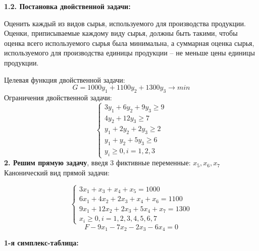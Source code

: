 {\bf1.2. Постановка двойственной задачи:}
\begin{flushleft}
    Оценить каждый из видов сырья, используемого для производства продукции. Оценки, приписываемые каждому виду сырья, должны быть такими, чтобы оценка всего используемого сырья была минимальна, а суммарная оценка сырья, используемого для производства единицы продукции – не меньше цены единицы продукции.
\end{flushleft}
Целевая функция двойственной задачи:
\begin{equation*}
    G = 1000y_1 + 1100y_2 + 1300y_3 \rightarrow min
\end{equation*}
Ограничения двойственной задачи:
\begin{equation*}
    \begin{cases}
        3y_1 + 6y_2 + 9y_3 \ge 9 \\
        4y_2 + 12y_3 \ge 7 \\
        y_1 + 2y_2 + 2y_3 \ge 2 \\
        y_1 + y_2 + 5y_3 \ge 6 \\
        y_i \ge 0, i = 1, 2, 3
    \end{cases}
\end{equation*}
{\bf2. Решим прямую задачу}, введя 3 фиктивные переменные: $x_5, x_6, x_7$\\
Канонический вид прямой задачи:

\begin{equation*}
    \begin{cases}
        3x_1 + x_3 + x_4 + x_5 = 1000 \\
        6x_1 + 4x_2 + 2x_3 + x_4 + x_6 = 1100 \\
        9x_1 + 12x_2 + 2x_3 + 5x_4 + x_7 = 1300 \\
        x_i \ge 0, i = 1, 2, 3, 4, 5, 6, 7
    \end{cases}
\end{equation*}
\begin{equation*}
    F - 9x_1 - 7x_2 - 2x_3 - 6x_4 = 0
\end{equation*}

\begin{flushleft}
    {\bf1-я симплекс-таблица:}\\
\end{flushleft}

